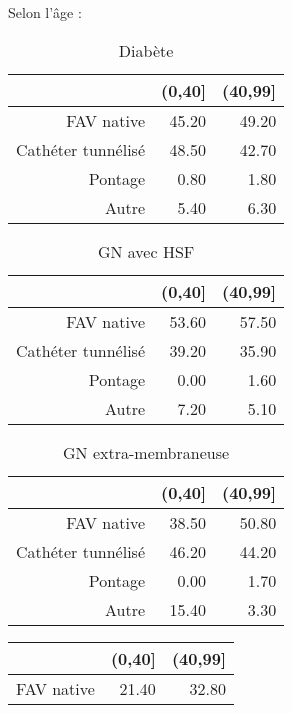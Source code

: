 \documentclass[11pt,a4paper]{article}\usepackage[]{graphicx}\usepackage[]{color}
\begin{document}
Selon l'âge :

\begin{multicols}{2}
\begin{table}[H]
\centering
\begin{tabular}{rrr}
  \hline
 & (0,40] & (40,99] \\ 
  \hline
FAV native & 45.20 & 49.20 \\ 
  Cathéter tunnélisé & 48.50 & 42.70 \\ 
  Pontage & 0.80 & 1.80 \\ 
  Autre & 5.40 & 6.30 \\ 
   \hline
\end{tabular}
\caption{Diabète} 
\end{table}
\begin{table}[H]
\centering
\begin{tabular}{rrr}
  \hline
 & (0,40] & (40,99] \\ 
  \hline
FAV native & 53.60 & 57.50 \\ 
  Cathéter tunnélisé & 39.20 & 35.90 \\ 
  Pontage & 0.00 & 1.60 \\ 
  Autre & 7.20 & 5.10 \\ 
   \hline
\end{tabular}
\caption{GN avec HSF} 
\end{table}
\begin{table}[H]
\centering
\begin{tabular}{rrr}
  \hline
 & (0,40] & (40,99] \\ 
  \hline
FAV native & 38.50 & 50.80 \\ 
  Cathéter tunnélisé & 46.20 & 44.20 \\ 
  Pontage & 0.00 & 1.70 \\ 
  Autre & 15.40 & 3.30 \\ 
   \hline
\end{tabular}
\caption{GN extra-membraneuse} 
\end{table}
\begin{table}[H]
\centering
\begin{tabular}{rrr}
  \hline
 & (0,40] & (40,99] \\ 
  \hline
FAV native & 21.40 & 32.80 \\ 

\end{tabular}
\end{table}
\end{multicols}
\end{document}
